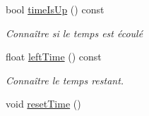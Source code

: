 \begin{DoxyCompactItemize}
bool \hyperlink{class_level_a72494b188b4e0ad5e903dc87661d052f}{time\-Is\-Up} () const 
\begin{DoxyCompactList}\small\item\em Connaître si le temps est écoulé \end{DoxyCompactList}\item 
float \hyperlink{class_level_a8905da43f541f853f45224ea08cdc8ab}{left\-Time} () const 
\begin{DoxyCompactList}\small\item\em Connaître le temps restant. \end{DoxyCompactList}\item 
\hypertarget{class_level_a71db09429d1295bb6bc7d55ae4e5da25}{void \hyperlink{class_level_a71db09429d1295bb6bc7d55ae4e5da25}{reset\-Time} ()}\label{class_level_a71db09429d1295bb6bc7d55ae4e5da25}


\end{DoxyCompactItemize}

